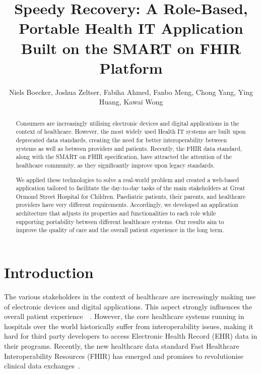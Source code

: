 \documentclass[sigconf]{acmart}
\begin{document}
%
\title{Speedy Recovery: A Role-Based, Portable Health IT Application Built on the SMART on FHIR Platform}

%
\author{Niels Boecker, Joshua Zeltser, Fabiha Ahmed, Fanbo Meng, Chong Yang, Ying Huang, Kawai Wong}


\begin{abstract}
Consumers are increasingly utilising electronic devices and digital applications in the context of healthcare. However, the most widely used Health IT systems are built upon deprecated data standards, creating the need for better interoperability between systems as well as between providers and patients. Recently, the FHIR data standard, along with the SMART on FHIR specification, have attracted the attention of the healthcare community, as they significantly improve upon legacy standards.

We applied these technologies to solve a real-world problem and created a web-based application tailored to facilitate the day-to-day tasks of the main stakeholders at Great Ormond Street Hospital for Children. Paediatric patients, their parents, and healthcare providers have very different requirements. Accordingly, we developed an application architecture that adjusts its properties and functionalities to each role while supporting portability between different healthcare systems. Our results aim to improve the quality of care and the overall patient experience in the long term.
\end{abstract}


%
\maketitle


\section{Introduction}
\label{sec:introduction}

The various stakeholders in the context of healthcare are increasingly making use of electronic devices and digital applications. This aspect strongly influences the overall patient experience~\cite{health-informatics}~\cite{digital-patient-experience}. However, the core healthcare systems running in hospitals over the world historically suffer from interoperability issues, making it hard for third party developers to access Electronic Health Record (EHR) data in their programs. Recently, the new healthcare data standard Fast Healthcare Interoperability Resources (FHIR) has emerged and promises to revolutionise clinical data exchanges~\cite{fhir-official}.
\end{document}
